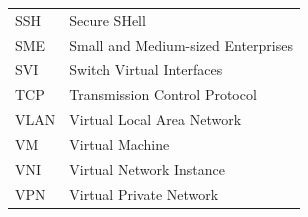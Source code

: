 \begin{tabular}{ l l }
\hspace{1cm} SSH & \hspace{3cm} Secure SHell  \\
\hspace{1cm} SME & \hspace{3cm} Small and Medium-sized Enterprises  \\
\hspace{1cm} SVI  & \hspace{3cm}  Switch Virtual Interfaces            \\
\hspace{1cm} TCP  & \hspace{3cm} Transmission Control Protocol       \\
\hspace{1cm} VLAN & \hspace{3cm} Virtual Local Area Network          \\
\hspace{1cm} VM & \hspace{3cm} Virtual Machine \\
\hspace{1cm} VNI & \hspace{3cm} Virtual Network Instance          \\
\hspace{1cm} VPN & \hspace{3cm} Virtual Private Network          \\



\end{tabular}  

\newpage
